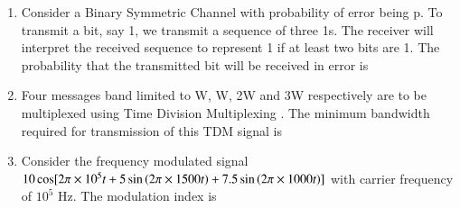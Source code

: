 \documentclass[a4paper, 11pt]{article}
\begin{document}
\begin{enumerate}
    \item Consider a Binary Symmetric Channel  with probability of error being p. To transmit a bit, say 1, we transmit a sequence of three 1s. The receiver will interpret the received sequence to represent 1 if at least two bits are 1. The probability that the transmitted bit will be received in error is
    \begin{enumerate}
    \end{enumerate}
    
    \hfill{}
    
    \item Four messages band limited to W, W, 2W and 3W respectively are to be multiplexed using Time Division Multiplexing . The minimum bandwidth required for transmission of this TDM signal is
    \begin{enumerate}
    \end{enumerate}
    
    \hfill{}
    
    \item Consider the frequency modulated signal $10\cos[2\pi \times 10^5 t + 5\sin\left(2\pi \times 1500t\right) + 7.5\sin\left(2\pi \times 1000t\right)]$ with carrier frequency of $10^5$ Hz. The modulation index is
    \begin{enumerate}
    \end{enumerate}
    

\end{enumerate}
\end{document}
